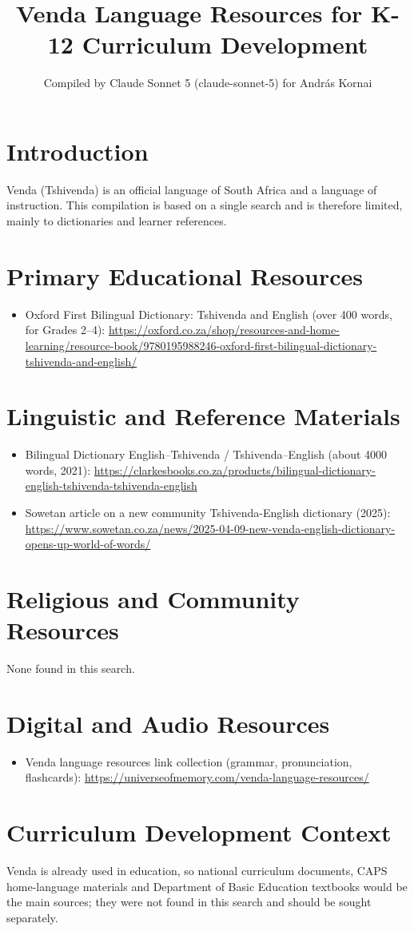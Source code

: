 \documentclass[12pt]{article}
\title{Venda Language Resources for K-12 Curriculum Development}
\author{Compiled by Claude Sonnet 5 (claude-sonnet-5) for Andr\'as Kornai}
\date{}
\begin{document}
\maketitle
\section{Introduction}
Venda (Tshivenda) is an official language of South Africa and a language of instruction. This compilation is based on a single search and is therefore limited, mainly to dictionaries and learner references.
\section{Primary Educational Resources}
\begin{itemize}
\item Oxford First Bilingual Dictionary: Tshivenda and English (over 400 words, for Grades 2--4): \url{https://oxford.co.za/shop/resources-and-home-learning/resource-book/9780195988246-oxford-first-bilingual-dictionary-tshivenda-and-english/}
\end{itemize}
\section{Linguistic and Reference Materials}
\begin{itemize}
\item Bilingual Dictionary English--Tshivenda / Tshivenda--English (about 4000 words, 2021): \url{https://clarkesbooks.co.za/products/bilingual-dictionary-english-tshivenda-tshivenda-english}
\item Sowetan article on a new community Tshivenda-English dictionary (2025): \url{https://www.sowetan.co.za/news/2025-04-09-new-venda-english-dictionary-opens-up-world-of-words/}
\end{itemize}
\section{Religious and Community Resources}
None found in this search.
\section{Digital and Audio Resources}
\begin{itemize}
\item Venda language resources link collection (grammar, pronunciation, flashcards): \url{https://universeofmemory.com/venda-language-resources/}
\end{itemize}
\section{Curriculum Development Context}
Venda is already used in education, so national curriculum documents, CAPS home-language materials and Department of Basic Education textbooks would be the main sources; they were not found in this search and should be sought separately.
\end{document}
